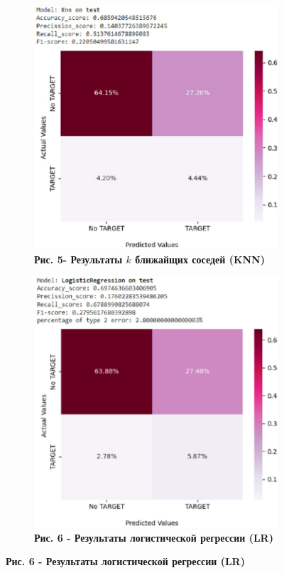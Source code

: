 \begin{figure}[H]
	\centering
	\begin{subfigure}[b]{0.45\textwidth}
		\centering
		\includegraphics[width=\textwidth]{assets/123}
		\caption*{\bfseries Рис. 5- Результаты $k$ ближайщих соседей (KNN)}
	\end{subfigure}
	\hfill
	\begin{subfigure}[b]{0.45\textwidth}
		\centering
		\includegraphics[width=\textwidth]{assets/124}
		\caption*{\bfseries Рис. 6 - Результаты логистической регрессии (LR)}
	\end{subfigure}
	
\end{figure}




